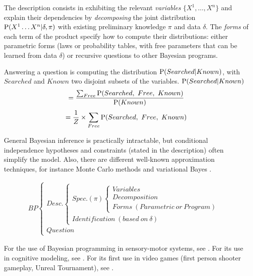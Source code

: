 The description consists in exhibiting the relevant \textit{variables} $\{X^1,\dots,X^n\}$ and explain their dependencies by \textit{decomposing} the joint distribution $\mathrm{P}(X^1\dots X^n | \delta, \pi)$ with existing preliminary knowledge $\pi$ and data $\delta$. The \textit{forms} of each term of the product specify how to compute their distributions: either parametric forms (laws or probability tables, with free parameters that can be learned from data $\delta$) or recursive questions to other Bayesian programs.

Answering a question is computing the distribution $\mathrm{P}(Searched | Known)$, with $Searched$ and $Known$ two disjoint subsets of the variables. 
$\mathrm{P}(Searched | Known) $
$$ = \frac{\sum_{Free}\PP(Searched,\ Free,\ Known)}{\PP(Known)}$$ $$ = \frac{1}{Z}\times \sum_{Free} \mathrm{P}(Searched,\ Free,\ Known)$$

General Bayesian inference is practically intractable, but conditional independence hypotheses and constraints (stated in the description) often simplify the model. Also, there are different well-known approximation techniques, for instance Monte Carlo methods \cite{MacKay} and variational Bayes \cite{Beal}.

\begin{small}
\begin{eqnarray*}
BP
\begin{cases}
Desc.
    \begin{cases}
    Spec. (\pi)
        \begin{cases}
        Variables\\
        Decomposition\\
        Forms\ (Parametric\ or\ Program)
        \end{cases}\\
    Identification\ (based\ on\ \delta)
    \end{cases}\\
Question
\end{cases}
\end{eqnarray*}
\end{small}
For the use of Bayesian programming in sensory-motor systems, see \cite{PRDMSMS}. For its use in cognitive modeling, see \cite{Colas10}. For its first use in video games (first person shooter gameplay, Unreal Tournament), see \cite{LeHy04}.

